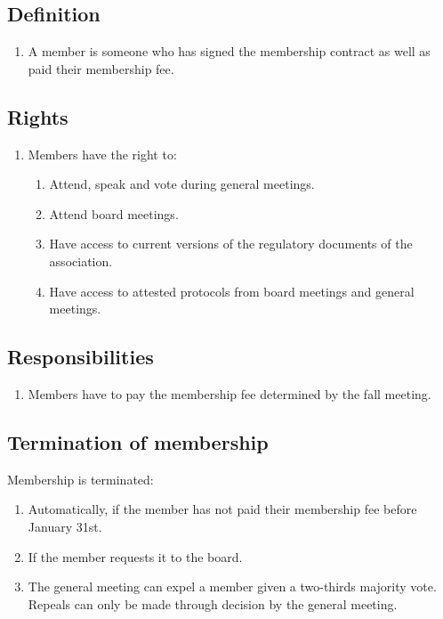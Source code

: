 \subsection{Definition}
\begin{enumerate}
  \item A member is someone who has signed the membership contract as well as paid their membership fee.
\end{enumerate}

\subsection{Rights}
\begin{enumerate}
  \item Members have the right to: 
  \begin{enumerate}
    \item Attend, speak and vote during general meetings.
    \item Attend board meetings.
    \item Have access to current versions of the regulatory documents of the association.
    \item Have access to attested protocols from board meetings and general meetings.
  \end{enumerate}
\end{enumerate}

\subsection{Responsibilities}
\begin{enumerate}
  \item Members have to pay the membership fee determined by the fall meeting.
\end{enumerate}

\setcounter{subsection}{14}
\subsection{Termination of membership}
Membership is terminated:
\begin{enumerate}
  \item Automatically, if the member has not paid their membership fee before January 31st.
  \item If the member requests it to the board.
  \item The general meeting can expel a member given a two-thirds majority vote. Repeals can only be made through decision by the general meeting.
\end{enumerate}

